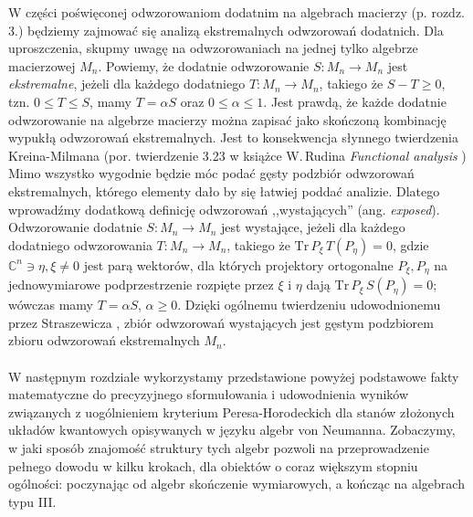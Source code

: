 W części poświęconej odwzorowaniom dodatnim na algebrach macierzy (p. rozdz. 3.)
będziemy zajmować się analizą ekstremalnych odwzorowań dodatnich.
Dla uproszczenia,
skupmy uwagę na odwzorowaniach na jednej tylko algebrze macierzowej $M_{n}$.
Powiemy, że dodatnie odwzorowanie $S: M_{n} \rightarrow M_{n}$ jest \emph{ekstremalne},
jeżeli dla każdego dodatniego $T: M_{n} \rightarrow M_{n}$, takiego że
$S - T \geq 0$, tzn. $0 \leq T \leq S$,
mamy $T = \alpha S$ oraz $0 \leq \alpha \leq 1$.
Jest prawdą, że każde dodatnie odwzorowanie na algebrze macierzy można zapisać
jako skończoną kombinację wypukłą odwzorowań ekstremalnych.
Jest to konsekwencja słynnego twierdzenia Kreina-Milmana
(por. twierdzenie 3.23 w książce W.\,Rudina \emph{Functional analysis}
\cite{Rudin1991})
Mimo wszystko wygodnie będzie móc podać gęsty podzbiór odwzorowań ekstremalnych,
którego elementy dało by się łatwiej poddać analizie.
Dlatego wprowadźmy dodatkową definicję odwzorowań ,,wystających''
(ang. \emph{exposed}).
Odwzorowanie dodatnie $S: M_{n} \rightarrow M_{n}$ jest wystające,
jeżeli dla każdego dodatniego odwzorowania $T: M_{n} \rightarrow M_{n}$,
takiego że $\text{Tr}\, P_{\xi} \, T(P_{\eta}) = 0$,
gdzie $\mathbb{C}^{n} \ni \eta, \xi \neq 0$ jest parą wektorów,
dla których projektory ortogonalne $P_{\xi}, P_{\eta}$ na jednowymiarowe
podprzestrzenie rozpięte przez $\xi$ i $\eta$ dają
$\text{Tr}\, P_{\xi} \, S(P_{\eta}) = 0$;
wówczas mamy $T = \alpha S$, $\alpha \geq 0$.
Dzięki ogólnemu twierdzeniu udowodnionemu przez Straszewicza
\cite{straszewicz1935exponierte},
zbiór odwzorowań wystających jest gęstym podzbiorem zbioru odwzorowań
ekstremalnych $M_{n}$.

\paragraph{}
W następnym rozdziale wykorzystamy przedstawione powyżej podstawowe fakty
matematyczne do precyzyjnego sformułowania i udowodnienia wyników związanych
z uogólnieniem kryterium Peresa-Horodeckich dla stanów złożonych układów
kwantowych opisywanych w języku algebr von Neumanna.
Zobaczymy,
w jaki sposób znajomość struktury tych algebr pozwoli na przeprowadzenie
pełnego dowodu w kilku krokach, dla obiektów o coraz większym stopniu ogólności:
poczynając od algebr skończenie wymiarowych,
a kończąc na algebrach typu III.
